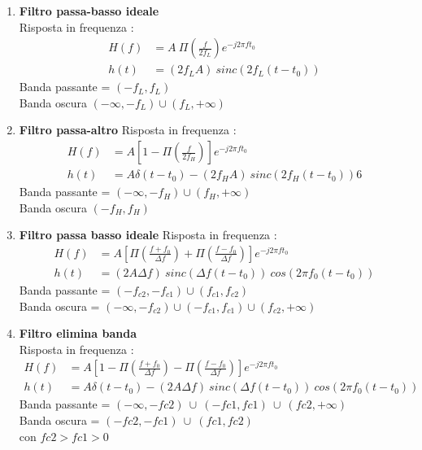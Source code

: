 \documentclass{article}
\theoremstyle{definition}
\begin{document}
\begin{enumerate}
	\item \textbf{Filtro passa-basso ideale} \\
	Risposta in frequenza : \begin{align*}
		H(f)&=A 	\ \Pi \left(\frac{f}{2f_L}\right)e^{-j2\pi f t_0} \\
		h(t)&= (2 f_L A) \ sinc(2f_L(t-t_0))
	\end{align*}
	Banda passante = $(-f_L,f_L)$\\
	Banda oscura $(-\infty,-f_L)\cup (f_L , + \infty)$ 
	\item \textbf{Filtro passa-altro}
	Risposta in frequenza : 
\begin{align*}
	H(f)&=A \left[1-\Pi \left(\frac{f}{2f_H}\right)\right]e^{-j2\pi f t_0} \\
	h(t)&=A \delta(t-t_0) - (2 f_H A) \ sinc(2f_H(t-t_0))6
\end{align*}
Banda passante = $(-\infty,-f_H)\cup (f_H , + \infty)$ \\
Banda oscura $(-f_H,f_H)$
\item \textbf{Filtro passa basso ideale}
Risposta in frequenza : 
\begin{align*}
H(f)&=A \left[\Pi \left(\frac{f+f_0}{\Delta f}\right)+\Pi \left(\frac{f-f_0}{\Delta f}\right)\right]e^{-j2\pi f t_0} \\
h(t)&= (2 A \Delta f ) \ sinc (\Delta f (t-t_0)) \ cos(2 \pi f_0 (t-t_0))
\end{align*}
Banda passante = $(-f_{c2},-f_{c1})\cup (f_{c1},f_{c2})$\\
Banda oscura = $(-\infty ,-f_{c2})\cup (-f_{c1},f_{c1}) \cup (f_{c2},+\infty)$
\item \textbf{Filtro elimina banda} \\
Risposta in frequenza : 
\begin{align*}
	H(f)&=A \left[1 - \Pi \left(\frac{f+f_0}{\Delta f}\right)-\Pi \left(\frac{f-f_0}{\Delta f}\right)\right]e^{-j2\pi f t_0} \\
	h(t)&= A\delta (t-t_0)- (2 A \Delta f ) \ sinc (\Delta f (t-t_0)) \ cos(2 \pi f_0 (t-t_0))
\end{align*}
Banda passante = $(-\infty,-fc2) \ \cup \ (-fc1,fc1) \ \cup \ (fc2,+\infty) $ \\
Banda oscura = $(-fc2 , -fc1) \ \cup \ (fc1,fc2)$\\
con $ fc2>fc1>0$
\end{enumerate}

\newpage 
\end{document}
